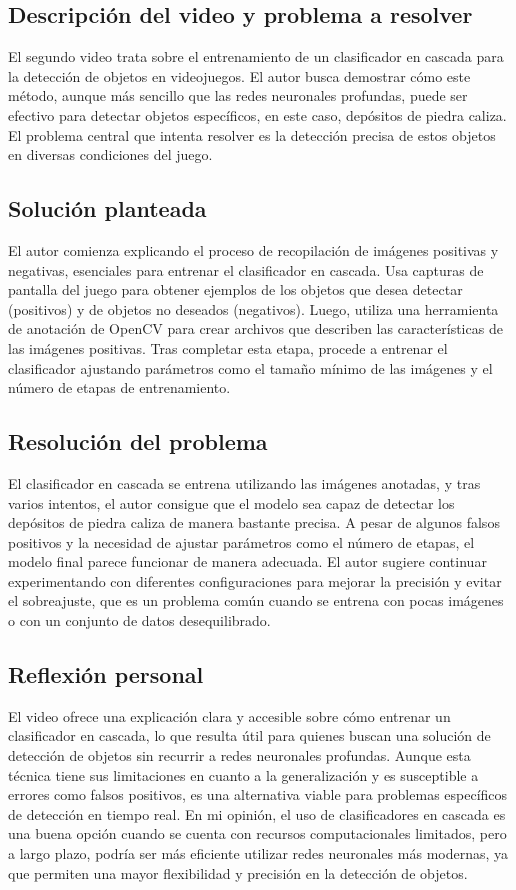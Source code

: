 \documentclass{article}
\begin{document}
\subsection*{Descripción del video y problema a resolver}
El segundo video trata sobre el entrenamiento de un clasificador en cascada para la detección de objetos en videojuegos. El autor busca demostrar cómo este método, aunque más sencillo que las redes neuronales profundas, puede ser efectivo para detectar objetos específicos, en este caso, depósitos de piedra caliza. El problema central que intenta resolver es la detección precisa de estos objetos en diversas condiciones del juego.

\subsection*{Solución planteada}
El autor comienza explicando el proceso de recopilación de imágenes positivas y negativas, esenciales para entrenar el clasificador en cascada. Usa capturas de pantalla del juego para obtener ejemplos de los objetos que desea detectar (positivos) y de objetos no deseados (negativos). Luego, utiliza una herramienta de anotación de OpenCV para crear archivos que describen las características de las imágenes positivas. Tras completar esta etapa, procede a entrenar el clasificador ajustando parámetros como el tamaño mínimo de las imágenes y el número de etapas de entrenamiento.

\subsection*{Resolución del problema}
El clasificador en cascada se entrena utilizando las imágenes anotadas, y tras varios intentos, el autor consigue que el modelo sea capaz de detectar los depósitos de piedra caliza de manera bastante precisa. A pesar de algunos falsos positivos y la necesidad de ajustar parámetros como el número de etapas, el modelo final parece funcionar de manera adecuada. El autor sugiere continuar experimentando con diferentes configuraciones para mejorar la precisión y evitar el sobreajuste, que es un problema común cuando se entrena con pocas imágenes o con un conjunto de datos desequilibrado.

\subsection*{Reflexión personal}
El video ofrece una explicación clara y accesible sobre cómo entrenar un clasificador en cascada, lo que resulta útil para quienes buscan una solución de detección de objetos sin recurrir a redes neuronales profundas. Aunque esta técnica tiene sus limitaciones en cuanto a la generalización y es susceptible a errores como falsos positivos, es una alternativa viable para problemas específicos de detección en tiempo real. En mi opinión, el uso de clasificadores en cascada es una buena opción cuando se cuenta con recursos computacionales limitados, pero a largo plazo, podría ser más eficiente utilizar redes neuronales más modernas, ya que permiten una mayor flexibilidad y precisión en la detección de objetos.
\end{document}
